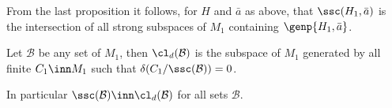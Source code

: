 From the last proposition it follows, for $H$ and $\bar a$ as above, that $\ssc(H_{1},\bar a)$ is
the intersection of all strong subspaces of $M_{1}$ containing $\genp{H_{1},\bar a}$. %
\begin{rem}\label{cielle2}
Let $\mathcal{B}$ be any set of $M_{1}$, then
$\cl_{d}(\mathcal{B})$ is the subspace of $M_{1}$ generated by all finite $C_{1}\inn M_{1}$ such that $\delta(C_{1}/
\ssc(\mathcal{B}))=0$.

In particular $\ssc(\mathcal{B})\inn\cl_{d}(\mathcal{B})$ for all sets $\mathcal{B}$.
\end{rem}
%
